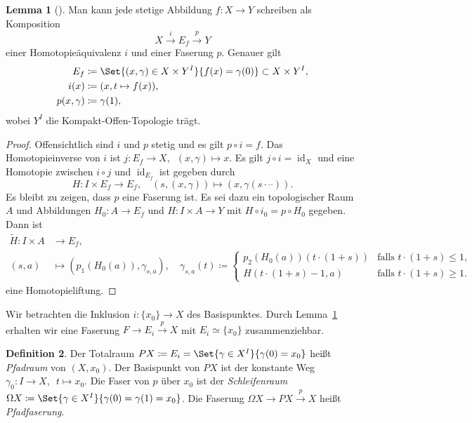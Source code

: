 \documentclass[11pt, a4paper, german]{article}
\theoremstyle{definition}
\newtheorem{lem}{Lemma}
\newtheorem{defn}[lem]{Definition}
\theoremstyle{remark}
\DeclareMathOperator{\id}{id} %
\newcommand{\blank}{\text{--}} %
\newcommand{\I}{I} %
\begin{document}
\begin{lem}[{\cite[Prop 4.64]{hatcher:at}}]\label{convert-to-fibration}
  Man kann jede stetige Abbildung $f : X \to Y$ schreiben als Komposition
  \[ X \xrightarrow{i} E_f \xrightarrow{p} Y \]
  einer Homotopieäquivalenz $i$ und einer Faserung $p$.
  Genauer gilt
  \begin{align*}
    E_f & \coloneqq \Set{(x, \gamma) \in X \times Y^\I}{f(x) = \gamma(0)} \subset X \times Y^\I, \\
    i(x) & \coloneqq (x, t \mapsto f(x)), \\
    p(x, \gamma) & \coloneqq \gamma(1),
  \end{align*}
  wobei $Y^\I$ die Kompakt-Offen-Topologie trägt.
\end{lem}

\begin{proof}
  Offensichtlich sind $i$ und $p$ stetig und es gilt $p \circ i = f$.
  Das Homotopieinverse von $i$ ist $j : E_f \to X, \enspace (x, \gamma) \mapsto x$.
  Es gilt $j \circ i = \id_X$ und eine Homotopie zwischen $i \circ j$ und $\id_{E_f}$ ist gegeben durch
  \[
    H : \I \times E_f \to E_f, \quad
    (s, (x, \gamma)) \mapsto (x, \gamma(s \cdot \blank)).
  \]
  Es bleibt zu zeigen, dass $p$ eine Faserung ist.
  Es sei dazu ein topologischer Raum $A$ und Abbildungen $H_0 : A \to E_f$ und $H : \I \times A \to Y$ mit $H \circ i_0 = p \circ H_0$ gegeben.
  Dann ist
  \begin{align*}
    \tilde{H} : \I \times A & \to E_f, \\
    (s, a) & \mapsto (p_1(H_0(a)), \gamma_{s, a}), \quad
    \gamma_{s, a}(t) \coloneqq \begin{cases}
      p_2(H_0(a))(t \cdot (1+s)) & \text{falls $t \cdot (1+s) \leq 1$,} \\
      H(t \cdot (1+s) - 1, a) & \text{falls $t \cdot (1+s) \geq 1$.}
    \end{cases}
  \end{align*}
  eine Homotopieliftung.
\end{proof}

Wir betrachten die Inklusion $i : \{ x_0 \} \to X$ des Basispunktes.
Durch Lemma~\ref{convert-to-fibration} erhalten wir eine Faserung $F \to E_i \xrightarrow{p} X$ mit $E_i \simeq \{ x_0 \}$ zusammenziehbar.

\begin{defn}
  Der Totalraum $PX \coloneqq E_i = \Set{\gamma \in X^\I}{\gamma(0) = x_0}$ heißt \emph{Pfadraum} von $(X, x_0)$.
  Der Basispunkt von $PX$ ist der konstante Weg $\gamma_0 : \I \to X, \enspace t \mapsto x_0$.
  Die Faser von $p$ über $x_0$ ist der \emph{Schleifenraum}
  $\Omega X \coloneqq \Set{\gamma \in X^\I}{\gamma(0) = \gamma(1) = x_0}$.
  Die Faserung $\Omega X \to PX \xrightarrow{p} X$ heißt \emph{Pfadfaserung}.
\end{defn}
\end{document}
